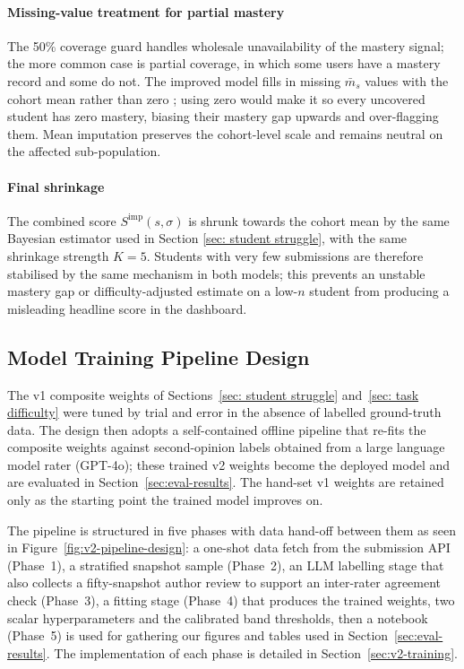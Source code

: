 \paragraph{Missing-value treatment for partial mastery}
The 50\% coverage guard handles wholesale unavailability of the mastery signal; the more common case is partial coverage, in which some users have a mastery record and some do not.
The improved model fills in missing $\bar{m}_s$ values with the cohort mean rather than zero \cite{little2014statistical}; using zero would make it so every uncovered student has zero mastery, biasing their mastery gap upwards and over-flagging them.
Mean imputation preserves the cohort-level scale and remains neutral on the affected sub-population.


\paragraph{Final shrinkage}

The combined score $S^{\mathrm{imp}}(s,\sigma)$ is shrunk towards the cohort mean by the same Bayesian estimator used in Section \ref{sec: student struggle}, with the same shrinkage strength $K = 5$. 
Students with very few submissions are therefore stabilised by the same mechanism in both models; this prevents an unstable mastery gap or difficulty-adjusted estimate on a low-$n$ student from producing a misleading headline score in the dashboard.

\subsection{Model Training Pipeline Design} \label{sec:v2-pipeline-design}

The v1 composite weights of Sections~\ref{sec: student struggle} and~\ref{sec: task difficulty} were tuned by trial and error in the absence of labelled ground-truth data.
The design then adopts a self-contained offline pipeline that re-fits the composite weights against second-opinion labels obtained from a large language model rater (GPT-4o); these trained v2 weights become the deployed model and are evaluated in Section~\ref{sec:eval-results}.
The hand-set v1 weights are retained only as the starting point the trained model improves on.

The pipeline is structured in five phases with data hand-off between them as seen in Figure~\ref{fig:v2-pipeline-design}: a one-shot data fetch from the submission API (Phase~1), a stratified snapshot sample (Phase~2), an LLM labelling stage that also collects a fifty-snapshot author review to support an inter-rater agreement check (Phase~3), a fitting stage (Phase~4) that produces the trained weights, two scalar hyperparameters and the calibrated band thresholds, then a notebook (Phase~5) is used for gathering our figures and tables used in Section~\ref{sec:eval-results}. The implementation of each phase is detailed in Section~\ref{sec:v2-training}.

